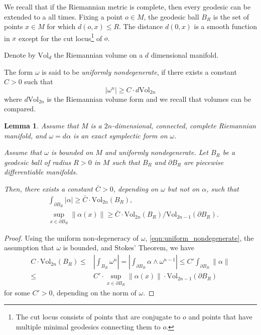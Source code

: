 \documentclass[11pt]{amsart}
\newtheorem{lem}[thm]{Lemma}
\theoremstyle{definition}
\theoremstyle{remark}
\numberwithin{equation}{section}
\begin{document}
We recall that if the Riemannian metric  is complete, then every geodesic can be extended to a all times.
Fixing a point $o\in M$, the geodesic ball $B_R$ is the set of points   $x\in M$ for which $d(o, x)\le R$.
The distance $d(0,x)$ is a smooth function in $x$ except for the cut locus\footnote{The cut locus consists of points that are conjugate to $o$ and points that have multiple minimal geodesics connecting them to $o$.} of $o$.
\medskip

Denote by $\textrm{Vol}_{d}$ the Riemannian volume on a $d$ dimensional manifold.

The form $\omega$ is  said to be \emph{uniformly nondegenerate}, if there exists a constant $C>0$ such that
 \begin{equation}\label{eqn:uniform_nondegenerate}
  |\omega^n| \ge C \cdot d{\textrm{Vol}_{2n}}
  \end{equation}
 where $d{\textrm{Vol}_{2n}}$ is the Riemannian volume form
 and we recall that volumes can be compared.



  \begin{lem}  \label{lem:lowerbound}
    Assume that $M$ is a $2n$-dimensional, connected,  complete Riemannian manifold, and $\omega=d\alpha$ is an exact symplectic form on $\omega$.

Assume  that $\omega$ is bounded on $M$ and uniformly nondegenerate.
Let $B_R$ be a geodesic ball of radius $R>0$ in $M$ such that $B_R$ and  $\partial B_R$
are piecewise differentiable manifolds.



Then, there exists a constant $\bar C>0$, depending on $\omega$ but not on $\alpha$, such that
  \begin{equation}
    \label{eqn:lowerbounds}
\begin{split}
  & \int_{\partial B_R} |\alpha| \ge
  \bar{C}\cdot \textrm{Vol}_{2n}(B_R), \\
  & \sup_{x \in  \partial B_R}\|\alpha(x)\| \ge
   \bar{C} \cdot \textrm{Vol}_{2n}(B_R)  / \textrm{Vol}_{2n -1}(\partial B_R)  .
   \end{split}
  \end{equation}

\end{lem}


\begin{proof}
Using  the uniform non-degeneracy of $\omega$, \eqref{eqn:uniform_nondegenerate},
 the assumption that $\omega$ is bounded,
and  Stokes' Theorem, we have
  \[
  \begin{split}
  C \cdot\textrm{Vol}_{2n}(B_R) \le & \left|\int_{B_R} \omega^n \right|=\left| \int_{\partial B_R} \alpha \wedge \omega^{n-1} \right|\le C'  \int_{\partial B_R}
 \| \alpha\|\\
  \le& C'    \cdot \sup_{x \in \partial B_R} \| \alpha(x)\|\cdot\textrm{Vol}_{2n-1}(\partial B_R)
  \end{split}\]
  for some $C' >0$, depending on the norm of $\omega$.
\end{proof}
\end{document}
